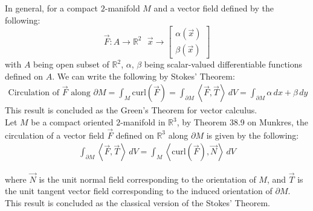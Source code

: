 \documentclass[11pt,oneside]{book}
\theoremstyle{break}
\theoremstyle{break}
\newcommand{\R}{\mathbb{R}}
\newcommand{\bmat}[1]{\begin{bmatrix} #1 \end{bmatrix}}
\begin{document}
In general, for a compact $2$-manifold $M$ and a vector field defined by the following:
$$\vec{F}:A \to \R^2 \ \ \ \vec{x} \to \bmat{\alpha(\vec{x})\\\beta(\vec{x})}$$ 
with $A$ being open subset of $\R^2$, $\alpha$, $\beta$ being scalar-valued differentiable functions defined on $A$. We can write the following by Stokes' Theorem:
\begin{align*}
\text{Circulation of }\vec{F}\text{ along }\partial M = \int_M \text{curl}( \vec{F}) = \int_{\partial M} \left< \vec{F},\vec{T}\right> \, dV = \int_{\partial M} \alpha\, dx + \beta\, dy
\end{align*}
This result is concluded as the Green's Theorem for vector calculus.\\

Let $M$ be a compact oriented $2$-manifold in $\R^3$, by Theorem 38.9 on Munkres, the circulation of a vector field $\vec{F}$ defined on $\R^3 $ along $\partial M$ is given by the following:
\begin{align*}
\int_{\partial M}\left< \vec{F}, \vec{T}\right> \, dV = \int_{M}\left< \text{curl}(\vec{F}), \vec{N}\right>\, dV
\end{align*}


where $\vec{N}$ is the unit normal field corresponding to the orientation of $M$, and $\vec{T}$ is the unit tangent vector field corresponding to the induced orientation of $\partial M$. This result is concluded as the classical version of the Stokes' Theorem. \\
\end{document}
